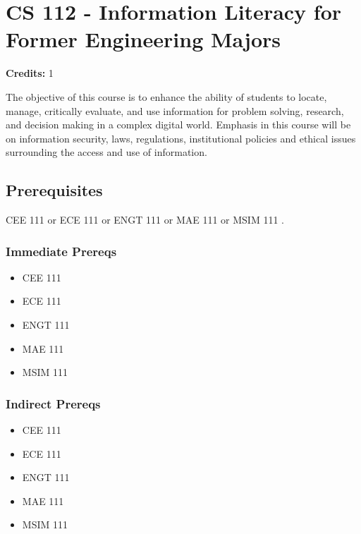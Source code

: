 \documentclass[]{article}
\date{}
\providecommand{\tightlist}{%
  \setlength{\itemsep}{0pt}\setlength{\parskip}{0pt}}
\begin{document}
{
\setcounter{tocdepth}{1}
\tableofcontents
}

\newpage

\section{CS 112 - Information Literacy for Former Engineering
Majors}\label{cs-112---information-literacy-for-former-engineering-majors}

\textbf{Credits:} 1

The objective of this course is to enhance the ability of students to
locate, manage, critically evaluate, and use information for problem
solving, research, and decision making in a complex digital world.
Emphasis in this course will be on information security, laws,
regulations, institutional policies and ethical issues surrounding the
access and use of information.

\subsection{Prerequisites}\label{prerequisites}

CEE 111 or ECE 111 or ENGT 111 or MAE 111 or MSIM 111 .

\subsubsection{Immediate Prereqs}\label{immediate-prereqs}

\begin{itemize}
\tightlist
\item
  CEE 111
\item
  ECE 111
\item
  ENGT 111
\item
  MAE 111
\item
  MSIM 111
\end{itemize}

\subsubsection{Indirect Prereqs}\label{indirect-prereqs}

\begin{itemize}
\tightlist
\item
  CEE 111
\item
  ECE 111
\item
  ENGT 111
\item
  MAE 111
\item
  MSIM 111
\end{itemize}
\end{document}
